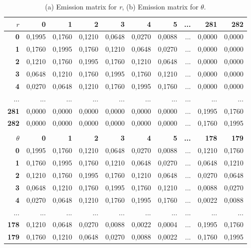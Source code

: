 \documentclass[a4paper,oneside,10pt]{article}
\begin{document}
\begin{table}
\caption{(a) Emission matrix for \textit{r}, (b) Emission matrix for \textit{$\theta $}.}
\centering
{\scriptsize
\begin{tabular}{|r|r|r|r|r|r|r|r|r|r|}
\hline
{\bf {\normalsize $r$}} & {\bf 0} & {\bf 1} & {\bf 2} & {\bf 3} & {\bf 4} & {\bf 5} & {\bf ...} & {\bf 281} & {\bf 282} \\
\hline
{\bf 0} & 0,1995 & 0,1760 & 0,1210 & 0,0648 & 0,0270 & 0,0088 & ... & 0,0000 & 0,0000 \\
\hline
{\bf 1} & 0,1760 & 0,1995 & 0,1760 & 0,1210 & 0,0648 & 0,0270 & ... & 0,0000 & 0,0000 \\
\hline
{\bf 2} & 0,1210 & 0,1760 & 0,1995 & 0,1760 & 0,1210 & 0,0648 & ... & 0,0000 & 0,0000 \\
\hline
{\bf 3} & 0,0648 & 0,1210 & 0,1760 & 0,1995 & 0,1760 & 0,1210 & ... & 0,0000 & 0,0000 \\
\hline
{\bf 4} & 0,0270 & 0,0648 & 0,1210 & 0,1760 & 0,1995 & 0,1760 & ... & 0,0000 & 0,0000 \\
\hline
... & ... & ... & ... & ... & ... & ... & ... & ... & ... \\
\hline
{\bf 281} & 0,0000 & 0,0000 & 0,0000 & 0,0000 & 0,0000 & 0,0000 & ... & 0,1995 & 0,1760 \\
\hline
{\bf 282} & 0,0000 & 0,0000 & 0,0000 & 0,0000 & 0,0000 & 0,0000 & ... & 0,1760 & 0,1995 \\
\hline
\multicolumn{10}{c}{} \\
\hline
{\bf {\normalsize $\theta$}} & {\bf 0} & {\bf 1} & {\bf 2} & {\bf 3} & {\bf 4} & {\bf 5} & {\bf ...} & {\bf 178} & {\bf 179} \\
\hline
{\bf 0} & 0,1995 & 0,1760 & 0,1210 & 0,0648 & 0,0270 & 0,0088 & ... & 0,1210 & 0,1760 \\
\hline
{\bf 1} & 0,1760 & 0,1995 & 0,1760 & 0,1210 & 0,0648 & 0,0270 & ... & 0,0648 & 0,1210 \\
\hline
{\bf 2} & 0,1210 & 0,1760 & 0,1995 & 0,1760 & 0,1210 & 0,0648 & ... & 0,0270 & 0,0648 \\
\hline
{\bf 3} & 0,0648 & 0,1210 & 0,1760 & 0,1995 & 0,1760 & 0,1210 & ... & 0,0088 & 0,0270 \\
\hline
{\bf 4} & 0,0270 & 0,0648 & 0,1210 & 0,1760 & 0,1995 & 0,1760 & ... & 0,0022 & 0,0088 \\
\hline
... & ... & ... & ... & ... & ... & ... & ... & ... & ... \\
\hline
{\bf 178} & 0,1210 & 0,0648 & 0,0270 & 0,0088 & 0,0022 & 0,0004 & ... & 0,1995 & 0,1760 \\
\hline
{\bf 179} & 0,1760 & 0,1210 & 0,0648 & 0,0270 & 0,0088 & 0,0022 & ... & 0,1760 & 0,1995 \\
\hline
\end{tabular} 
} 
\label{aba:table4}
\end{table}
\end{document}
